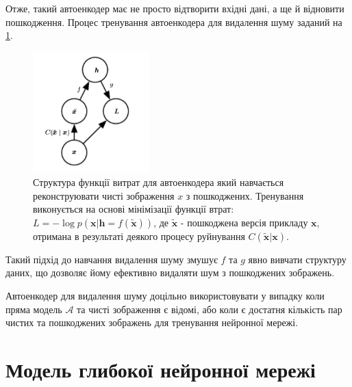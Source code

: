 \documentclass[14pt,a4paper]{extarticle}
\newcounter{e}
\numberwithin{equation}{section}
\numberwithin{figure}{section}
\begin{document}
	Отже, такий автоенкодер має не просто відтворити вхідні дані, а ще й відновити пошкодження. Процес тренування автоенкодера для видалення шуму заданий на \ref{fig:dae-graph}.
	\begin{figure}[h]
		\centering
		\includegraphics[width=0.4\textwidth]{../resources/dae-graph.png}
		\caption{
			Структура функції витрат для автоенкодера який навчається реконструювати чисті зображення $x$ з пошкоджених. Тренування виконується на основі мінімізації функції втрат: $L = - \log p (\boldsymbol {x} | \boldsymbol {h} = f (\tilde {\boldsymbol {x}}))$, де $\tilde {\boldsymbol {x}}$ - пошкоджена версія прикладу $\boldsymbol {x}$, отримана в результаті деякого процесу руйнування $C (\tilde {\boldsymbol {x}} | \boldsymbol {x})$. \cite{Goodfellow-et-al-2016}
		}
		\label{fig:dae-graph}
	\end{figure}
	
	Такий підхід до навчання видалення шуму змушує $f$ та $g$ явно вивчати структуру даних, що дозволяє йому ефективно видаляти шум з пошкоджених зображень.
	
	Автоенкодер для видалення шуму доцільно використовувати у випадку коли пряма модель $\mathcal{A}$ та чисті зображення є відомі, або коли є достатня кількість пар чистих та пошкоджених зображень для тренування нейронної мережі. 
	
	\newpage
	\thispagestyle{empty}
	\section{Модель глибокої нейронної мережі}
\end{document}
